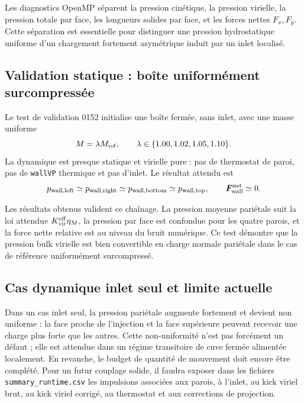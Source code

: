 \documentclass[11pt,a4paper]{article}
\begin{document}
Les diagnostics OpenMP séparent la pression cinétique, la pression virielle, la pression totale par face, les longueurs solides par face, et les forces nettes \(F_x,F_y\). Cette séparation est essentielle pour distinguer une pression hydrostatique uniforme d'un chargement fortement asymétrique induit par un inlet localisé.

\subsection{Validation statique : boîte uniformément surcompressée}

Le test de validation 0152 initialise une boîte fermée, sans inlet, avec une masse uniforme
\begin{equation}
  M = \lambda M_{\rm ref},
  \qquad \lambda\in\{1.00,1.02,1.05,1.10\}.
\end{equation}
La dynamique est presque statique et virielle pure : pas de thermostat de paroi, pas de \texttt{wallVP} thermique et pas d'inlet. Le résultat attendu est
\begin{equation}
  p_{\rm wall,left}\simeq p_{\rm wall,right}
  \simeq p_{\rm wall,bottom}\simeq p_{\rm wall,top},
  \qquad
  \bm{F}_{\rm wall}^{\rm net}\simeq 0.
\end{equation}

Les résultats obtenus valident ce chaînage. La pression moyenne pariétale suit la loi attendue \(K_{\rm vir}^{\rm eff}\eta_M\), la pression par face est confondue pour les quatre parois, et la force nette relative est au niveau du bruit numérique. Ce test démontre que la pression bulk virielle est bien convertible en charge normale pariétale dans le cas de référence uniformément surcompressé.

\subsection{Cas dynamique inlet seul et limite actuelle}

Dans un cas inlet seul, la pression pariétale augmente fortement et devient non uniforme : la face proche de l'injection et la face supérieure peuvent recevoir une charge plus forte que les autres. Cette non-uniformité n'est pas forcément un défaut ; elle est attendue dans un régime transitoire de cuve fermée alimentée localement. En revanche, le budget de quantité de mouvement doit encore être complété. Pour un futur couplage solide, il faudra exposer dans les fichiers \texttt{summary\_runtime.csv} les impulsions associées aux parois, à l'inlet, au kick viriel brut, au kick viriel corrigé, au thermostat et aux corrections de projection.
\end{document}
